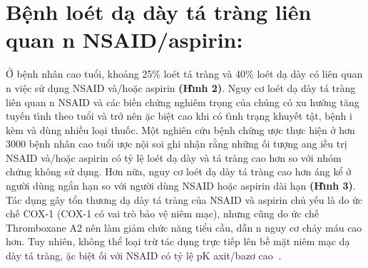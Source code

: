 \documentclass[9pt,twocolumn]{article}
\begin{document}
\section*
  {\textbf{B{\^{\d{e}}}nh lo{\'e}t d{\d{a}} d\`{a}y t\'{a} tr\`{a}ng li{\^{e}}n quan n NSAID/aspirin:}}
Ở b{\^{\d{e}}}nh nh\^{a}n cao tuổi, khoảng 25\% lo{\'e}t t\'{a} tr\`{a}ng v\`{a} 40\% lo{\'e}t d{\d{a}} d\`{a}y c{\'{o}} li{\^{e}}n quan n vi{\^{\d{e}}}c sử d\d{u}ng NSAID v\`{a}/hoặc aspirin \textbf{(H\`{\i}nh 2)}. Nguy cơ lo{\'e}t d{\d{a}} d\`{a}y t\'{a} tr\`{a}ng li{\^{e}}n quan n NSAID v\`{a} c\'{a}c bi{{\'{\^{e}}}}n chứng nghi{\^{e}}m tr\d{o}ng của ch\'{u}ng c{\'{o}} xu hướng t{\u{a}}ng tuy{{\'{\^{e}}}}n t\'{\i}nh theo  tuổi v\`{a} trở n{\^{e}}n \text{\dj}ặc bi{\^{\d{e}}}t cao khi c{\'{o}} t\`{\i}nh tr{\d{a}}ng khuy{{\'{\^{e}}}}t t{\^{\d{a}}}t, b{\^{\d{e}}}nh \text{\dj}i k{\`e}m v\`{a} d\`{u}ng nhiều lo{\d{a}}i thuốc. M{\^{\d{o}}}t nghi{\^{e}}n cứu b{\^{\d{e}}}nh chứng \text{\dj}ược thực hi{\^{\d{e}}}n ở hơn 3000 b{\^{\d{e}}}nh nh\^{a}n cao tuổi \text{\dj}ược n{\^{\d{o}}}i soi  ghi nh{\^{\d{a}}}n rằng những \text{\dj}ối tượng \text{\dj}ang \text{\dj}iều tr\d{i} NSAID v\`{a}/hoặc aspirin c{\'{o}} tỷ l{\^{\d{e}}} lo{\'e}t d{\d{a}} d\`{a}y v\`{a} t\'{a} tr\`{a}ng cao hơn so với nh{\'{o}}m chứng kh{\^o}ng sử d\d{u}ng. Hơn nữa, nguy cơ lo{\'e}t d{\d{a}} d\`{a}y t\'{a} tr\`{a}ng cao hơn \text{\dj}\'{a}ng kể ở người d\`{u}ng ngắn h{\d{a}}n so với người d\`{u}ng NSAID hoặc aspirin d\`{a}i h{\d{a}}n \textbf{(H\`{\i}nh 3)}. T\'{a}c d\d{u}ng g\^{a}y tổn thương d{\d{a}} d\`{a}y t\'{a} tr\`{a}ng của NSAID v\`{a} aspirin chủ y{{\'{\^{e}}}}u l\`{a} do ức ch{{\'{\^{e}}}} COX-1 (COX-1 c{\'{o}} vai tr\`{o} bảo v{\^{\d{e}}} ni{\^{e}}m m{\d{a}}c), nhưng c{\~{u}}ng do ức ch{{\'{\^{e}}}} Thromboxane A2 n{\^{e}}n l\`{a}m giảm chức n{\u{a}}ng tiểu cầu, dẫn n nguy cơ chảy m\'{a}u cao hơn. Tuy nhi{\^{e}}n, kh{\^o}ng thể lo{\d{a}}i trừ t\'{a}c d\d{u}ng trực ti{{\'{\^{e}}}}p l{\^{e}}n bề mặt ni{\^{e}}m m{\d{a}}c d{\d{a}} d\`{a}y t\'{a} tr\`{a}ng, \text{\dj}ặc bi{\^{\d{e}}}t \text{\dj}ối với NSAID c{\'{o}} tỷ l{\^{\d{e}}} pK axit/bazơ cao\unskip~\cite{2901310:34531811}\ensuremath{^{}}.
\end{document}

